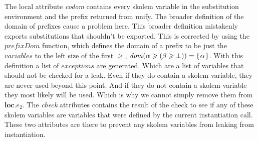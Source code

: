 \documentclass[twoside, titlepage, openright, a4paper]{book}
\newcommand{\Varid}[1]{\mathit{#1}}
\renewcommand{\geq}{\geqslant}
\begin{document}
The local attribute \emph{codom} contains every skolem variable in the substitution environment and the prefix returned from unify. The broader definition of the domain of prefixes cause a problem here. This broader definition mistakenly exports substitutions that shouldn't be exported. This is corrected by using the \ensuremath{\Varid{prefixDom}} function, which defines the domain of a prefix to be just the \ensuremath{\Varid{variables}} to the left size of the first \ensuremath{\geq}, \ensuremath{\Varid{dom}(\alpha\geq(\beta\geq\bot))\mathrel{=}\{\mskip1.5mu \alpha\mskip1.5mu\}}. With this definition a list of \ensuremath{\Varid{exceptions}} are generated. Which are a list of variables that should not be checked for a leak. Even if they do contain a skolem variable, they are never used beyond this point. And if they do not contain a skolem variable they most likely will be used. Which is why we cannot simply remove them from \ensuremath{\mathbf{loc}\mbox{.}e_2}.
The \emph{check} attributes contains the result of the check to see if any of these skolem variables are variables that were defined by the current instantiation call. These two attributes are there to prevent any skolem variables from leaking from instantiation.
\end{document}
